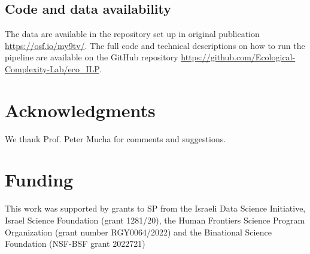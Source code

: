 \documentclass[oneside, a4paper, onecolumn, 11pt]{article}
\begin{document}
\begin{refsection}
\subsection*{Code and data availability}
The data are available in the repository set up in original publication \url{https://osf.io/my9tv/}. The full code and technical descriptions on how to run the pipeline are available on the GitHub repository \url{https://github.com/Ecological-Complexity-Lab/eco_ILP}. 

\section*{Acknowledgments}
We thank Prof. Peter Mucha for comments and suggestions.

\section*{Funding}
This work was supported by grants to SP from the Israeli Data Science Initiative, Israel Science Foundation (grant 1281/20), the Human Frontiers Science Program Organization (grant number RGY0064/2022) and the Binational Science Foundation (NSF-BSF grant 2022721)
 




\printbibliography[heading=subbibliography, title={References}]

\end{refsection}
\end{document}
